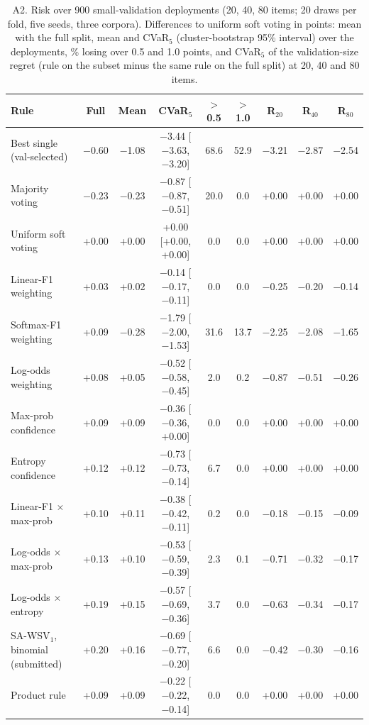 \begin{table}[!htbp]\centering\scriptsize\setlength{\tabcolsep}{2.5pt}
\caption*{A2. Risk over 900 small-validation deployments (20, 40, 80 items; 20 draws per fold, five seeds, three corpora). Differences to uniform soft voting in points: mean with the full split, mean and CVaR$_5$ (cluster-bootstrap 95\% interval) over the deployments, \% losing over 0.5 and 1.0 points, and CVaR$_5$ of the validation-size regret (rule on the subset minus the same rule on the full split) at 20, 40 and 80 items.}
\begin{tabular}{lcccccccc}\toprule
Rule & Full & Mean & CVaR$_5$ & $>$0.5 & $>$1.0 & R$_{20}$ & R$_{40}$ & R$_{80}$ \\ \midrule
Best single (val-selected) & $-$0.60 & $-$1.08 & $-$3.44 [$-$3.63, $-$3.20] & 68.6 & 52.9 & $-$3.21 & $-$2.87 & $-$2.54 \\
Majority voting & $-$0.23 & $-$0.23 & $-$0.87 [$-$0.87, $-$0.51] & 20.0 & 0.0 & +0.00 & +0.00 & +0.00 \\
Uniform soft voting & +0.00 & +0.00 & +0.00 [+0.00, +0.00] & 0.0 & 0.0 & +0.00 & +0.00 & +0.00 \\
Linear-F1 weighting & +0.03 & +0.02 & $-$0.14 [$-$0.17, $-$0.11] & 0.0 & 0.0 & $-$0.25 & $-$0.20 & $-$0.14 \\
Softmax-F1 weighting & +0.09 & $-$0.28 & $-$1.79 [$-$2.00, $-$1.53] & 31.6 & 13.7 & $-$2.25 & $-$2.08 & $-$1.65 \\
Log-odds weighting & +0.08 & +0.05 & $-$0.52 [$-$0.58, $-$0.45] & 2.0 & 0.2 & $-$0.87 & $-$0.51 & $-$0.26 \\
Max-prob confidence & +0.09 & +0.09 & $-$0.36 [$-$0.36, +0.00] & 0.0 & 0.0 & +0.00 & +0.00 & +0.00 \\
Entropy confidence & +0.12 & +0.12 & $-$0.73 [$-$0.73, $-$0.14] & 6.7 & 0.0 & +0.00 & +0.00 & +0.00 \\
Linear-F1 $\times$ max-prob & +0.10 & +0.11 & $-$0.38 [$-$0.42, $-$0.11] & 0.2 & 0.0 & $-$0.18 & $-$0.15 & $-$0.09 \\
Log-odds $\times$ max-prob & +0.13 & +0.10 & $-$0.53 [$-$0.59, $-$0.39] & 2.3 & 0.1 & $-$0.71 & $-$0.32 & $-$0.17 \\
Log-odds $\times$ entropy & +0.19 & +0.15 & $-$0.57 [$-$0.69, $-$0.36] & 3.7 & 0.0 & $-$0.63 & $-$0.34 & $-$0.17 \\
SA-WSV$_1$, binomial (submitted) & +0.20 & +0.16 & $-$0.69 [$-$0.77, $-$0.20] & 6.6 & 0.0 & $-$0.42 & $-$0.30 & $-$0.16 \\
Product rule & +0.09 & +0.09 & $-$0.22 [$-$0.22, $-$0.14] & 0.0 & 0.0 & +0.00 & +0.00 & +0.00 \\

\end{tabular}
\end{table}
